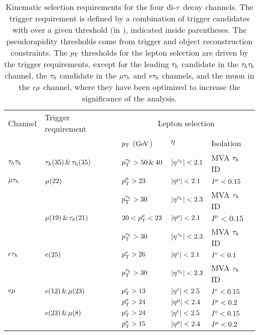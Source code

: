 \begin{table*}[htbp]
\centering
\begin{tabular}{lllll}
  Channel           &         Trigger requirement              &    \multicolumn{3}{c}{Lepton selection}                 \\ \cline{3-5}
 & & $p_\mathrm{T}$ ($\mathrm{GeV}$) & $\eta$ & Isolation \\
\hline
 $\tau_{h}\tau_{h}$    &         $\tau_{h} (35)\,\&\,\tau_{h} (35)$              &     $p_\mathrm{T}^{\tau_{h}}>50\,\&\,40$ & $\lvert\eta^{\tau_{h}}\rvert<2.1$  &    MVA $\tau_{h}$ ID              \\
\hline
  $\mu\tau_{h}$       &         $\mu(22)$     &     $p_\mathrm{T}^{\mu}>23$  &  $\lvert\eta^{\mu}\rvert<2.1$   &   $I^{\mu}<0.15$       \\
                          &       &     $p_\mathrm{T}^{\tau_{h}}>30$ &  $\lvert\eta^{\tau_{h}}\rvert<2.3$ &   MVA $\tau_{h}$ ID  \\[\cmsTabSkip]

                   &         $\mu(19)\,\&\,\tau_{h} (21)$     &     $20<p_\mathrm{T}^{\mu}<23$  &  $\lvert\eta^{\mu}\rvert<2.1$   &   $I^{\mu}<0.15$       \\
                   &           &     $p_\mathrm{T}^{\tau_{h}}>30$ &  $\lvert\eta^{\tau_{h}}\rvert<2.3$ &   MVA $\tau_{h}$ ID  \\
\hline
  $e\tau_{h}$        &         $e (25)$     &     $p_\mathrm{T}^{e}>26$  & $\lvert\eta^{e}\rvert<2.1$  &   $I^{e}<0.1$  \\
                          &       &     $p_\mathrm{T}^{\tau_{h}}>30$ &  $\lvert\eta^{\tau_{h}}\rvert<2.3$ &   MVA $\tau_{h}$ ID  \\
\hline
  $e\mu$        &         $e(12)\,\&\,\mu (23)$    &     $p_\mathrm{T}^{e}>13$ & $\lvert\eta^{e}\rvert<2.5$             & $I^{e}<0.15$   \\
                          &              &     $p_\mathrm{T}^{\mu}>24$ & $\lvert\eta^{\mu}\rvert<2.4$  & $I^{\mu}<0.2$ \\[\cmsTabSkip]
         &         $e(23)\,\&\,\mu (8)$    &     $p_\mathrm{T}^{e}>24$ & $\lvert\eta^{e}\rvert<2.5$             & $I^{e}<0.15$   \\
                          &          &     $p_\mathrm{T}^{\mu}>15$ & $\lvert\eta^{\mu}\rvert<2.4$  & $I^{\mu}<0.2$    \\
\hline
\end{tabular}
\caption{Kinematic selection requirements for the four di-$\tau$ decay channels.
The trigger requirement is defined by a combination of trigger candidates with \pt over a given threshold (in \GeV), indicated inside parentheses. The pseudorapidity thresholds come from trigger and object reconstruction constraints. The $p_\mathrm{T}$ thresholds for the lepton selection are driven by the trigger requirements, except for the leading $\tau_{h}$ candidate in the $\tau_{h}\tau_{h}$ channel, the $\tau_{h}$ candidate in the $\mu\tau_{h}$ and $e\tau_{h}$ channels, and the muon in the $e\mu$ channel, where they have been optimized to increase the significance of the analysis.
\label{tab:inclusive_selection}
}
\end{table*}

